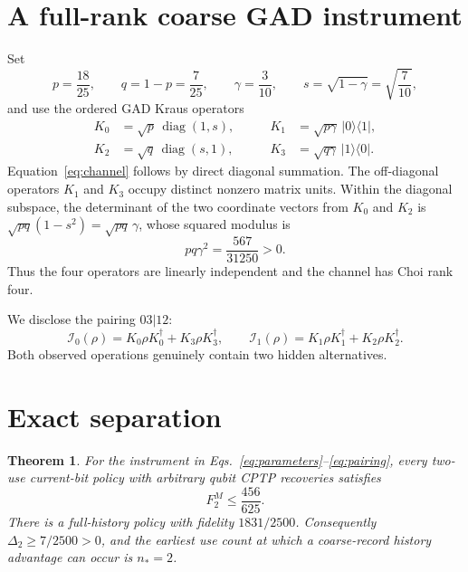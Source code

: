 \documentclass[11pt]{article}
\newtheorem{theorem}{Theorem}
\newcommand{\cI}{\mathcal I}
\newcommand{\diag}{\operatorname{diag}}
\begin{document}
\section{A full-rank coarse GAD instrument}

Set
\begin{equation}
 p=\frac{18}{25},\qquad q=1-p=\frac7{25},\qquad
 \gamma=\frac3{10},\qquad s=\sqrt{1-\gamma}=\sqrt{\frac7{10}},
 \label{eq:parameters}
\end{equation}
and use the ordered GAD Kraus operators
\begin{equation}
 \begin{aligned}
 K_0&=\sqrt p\,\diag(1,s),\qquad&
 K_1&=\sqrt{p\gamma}\,|0\rangle\langle1|,\\
 K_2&=\sqrt q\,\diag(s,1),\qquad&
 K_3&=\sqrt{q\gamma}\,|1\rangle\langle0|.
 \end{aligned}
 \label{eq:kraus}
\end{equation}
Equation~\eqref{eq:channel} follows by direct diagonal summation.  The off-diagonal
operators $K_1$ and $K_3$ occupy distinct nonzero matrix units.  Within the diagonal
subspace, the determinant of the two coordinate vectors from $K_0$ and $K_2$ is
$\sqrt{pq}(1-s^2)=\sqrt{pq}\,\gamma$, whose squared modulus is
\begin{equation}
 pq\gamma^2=\frac{567}{31250}>0.
\end{equation}
Thus the four operators are linearly independent and the channel has Choi rank four.

We disclose the pairing $03|12$:
\begin{equation}
 \cI_0(\rho)=K_0\rho K_0^\dagger+K_3\rho K_3^\dagger,
 \qquad
 \cI_1(\rho)=K_1\rho K_1^\dagger+K_2\rho K_2^\dagger.
 \label{eq:pairing}
\end{equation}
Both observed operations genuinely contain two hidden alternatives.

\section{Exact separation}

\begin{theorem}\label{thm:main}
For the instrument in Eqs.~\eqref{eq:parameters}--\eqref{eq:pairing}, every two-use
current-bit policy with arbitrary qubit CPTP recoveries satisfies
\begin{equation}
 F_2^M\le\frac{456}{625}.
 \label{eq:markovbound}
\end{equation}
There is a full-history policy with fidelity $1831/2500$.  Consequently
$\Delta_2\ge 7/2500>0$, and the earliest use count at which a coarse-record history
advantage can occur is $n_*=2$.
\end{theorem}
\end{document}
